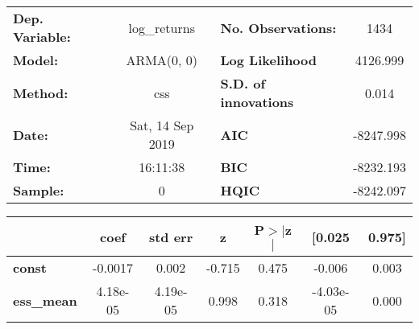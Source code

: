 \begin{center}
\begin{tabular}{lclc}
\toprule
\textbf{Dep. Variable:} &   log\_returns   & \textbf{  No. Observations:  } &    1434     \\
\textbf{Model:}         &    ARMA(0, 0)    & \textbf{  Log Likelihood     } &  4126.999   \\
\textbf{Method:}        &       css        & \textbf{  S.D. of innovations} &   0.014     \\
\textbf{Date:}          & Sat, 14 Sep 2019 & \textbf{  AIC                } & -8247.998   \\
\textbf{Time:}          &     16:11:38     & \textbf{  BIC                } & -8232.193   \\
\textbf{Sample:}        &        0         & \textbf{  HQIC               } & -8242.097   \\
\bottomrule
\end{tabular}
\begin{tabular}{lcccccc}
                   & \textbf{coef} & \textbf{std err} & \textbf{z} & \textbf{P$> |$z$|$} & \textbf{[0.025} & \textbf{0.975]}  \\
\midrule
\textbf{const}     &      -0.0017  &        0.002     &    -0.715  &         0.475        &       -0.006    &        0.003     \\
\textbf{ess\_mean} &     4.18e-05  &     4.19e-05     &     0.998  &         0.318        &    -4.03e-05    &        0.000     \\
\bottomrule
\end{tabular}
\end{center}
